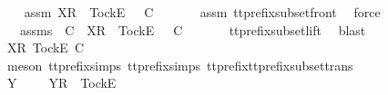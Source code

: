 \begin{isabellebody}
\ \ \isamarkupfalse%
\ assm{}{\isacharprime}{\isacharcolon}\ {\isachardoublequoteopen}{\isacharbrackleft}X{\isacharbrackright}\isactrlsub R\ {\isacharhash}\ {\isacharbrackleft}Tock{\isacharbrackright}\isactrlsub E\ {\isacharhash}\ {\isasymsigma}{\isacharprime}{\isacharprime}\ {\isasymlesssim}\isactrlsub C\ {\isasymsigma}{\isachardoublequoteclose}\isanewline
\ \ \ \ \isamarkupfalse%
\ assm{}\ tt{\isacharunderscore}prefix{\isacharunderscore}subset{\isacharunderscore}front\ \isamarkupfalse%
\ force\isanewline
\ \ \isamarkupfalse%
\ \isamarkupfalse%
\ {\isasymrho}{\isacharprime}{\isacharprime}\ \ {\isasymrho}{\isacharprime}{\isacharprime}{\isacharunderscore}assms{\isacharcolon}\ {\isachardoublequoteopen}{\isasymrho}{\isacharprime}{\isacharprime}\ {\isasymle}\isactrlsub C\ {\isasymsigma}{\isachardoublequoteclose}\ {\isachardoublequoteopen}{\isacharbrackleft}X{\isacharbrackright}\isactrlsub R\ {\isacharhash}\ {\isacharbrackleft}Tock{\isacharbrackright}\isactrlsub E\ {\isacharhash}\ {\isasymsigma}{\isacharprime}{\isacharprime}\ {\isasymlesssim}\isactrlsub C\ {\isasymrho}{\isacharprime}{\isacharprime}{\isachardoublequoteclose}\isanewline
\ \ \ \ \isamarkupfalse%
\ tt{\isacharunderscore}prefix{\isacharunderscore}subset{\isacharunderscore}lift\ \isamarkupfalse%
\ blast\isanewline
\ \ \isamarkupfalse%
\ \isamarkupfalse%
\ {\isachardoublequoteopen}{\isacharbrackleft}{\isacharbrackleft}X{\isacharbrackright}\isactrlsub R{\isacharcomma}\ {\isacharbrackleft}Tock{\isacharbrackright}\isactrlsub E{\isacharbrackright}\ {\isasymlesssim}\isactrlsub C\ {\isasymrho}{\isacharprime}{\isacharprime}{\isachardoublequoteclose}\isanewline
\ \ \ \ \isamarkupfalse%
\ {\isacharparenleft}meson\ tt{\isacharunderscore}prefix{\isachardot}simps{\isacharparenleft}{}{\isacharparenright}\ tt{\isacharunderscore}prefix{\isachardot}simps{\isacharparenleft}{}{\isacharparenright}\ tt{\isacharunderscore}prefix{\isacharunderscore}tt{\isacharunderscore}prefix{\isacharunderscore}subset{\isacharunderscore}trans{\isacharparenright}\isanewline
\ \ \isamarkupfalse%
\ \isamarkupfalse%
\ Y\ {\isasymrho}{\isacharprime}{\isacharprime}{\isacharprime}\ \ {\isachardoublequoteopen}{\isasymrho}{\isacharprime}{\isacharprime}\ {\isacharequal}\ {\isacharbrackleft}Y{\isacharbrackright}\isactrlsub R\ {\isacharhash}\ {\isacharbrackleft}Tock{\isacharbrackright}\isactrlsub E\ {\isacharhash}\ {\isasymrho}{\isacharprime}{\isacharprime}{\isacharprime}{\isachardoublequoteclose}\isanewline

\end{isabellebody}
